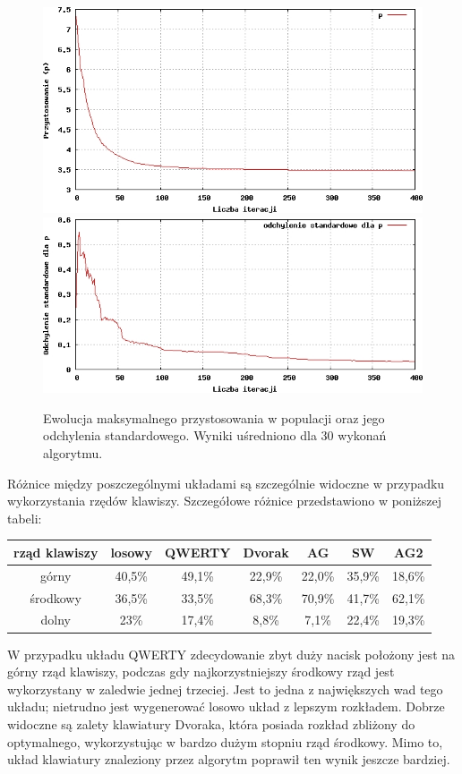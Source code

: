\documentclass{xmgr}
\begin{document}
\begin{figure}[!tbh]
\centering
\includegraphics[width=.8\hsize]{fig/fitness_time_en}
\includegraphics[width=.8\hsize]{fig/std_dev_time_en}
\caption{Ewolucja maksymalnego przystosowania w populacji oraz jego odchylenia standardowego. Wyniki uśredniono dla 30 wykonań algorytmu.}
\end{figure}

Różnice między poszczególnymi układami są szczególnie widoczne w przypadku wykorzystania rzędów klawiszy. Szczegółowe różnice przedstawiono w poniższej tabeli:\newline\newline
\begin{tabular}{ c | c | c | c | c | c | c }
  rząd klawiszy   & losowy & QWERTY & Dvorak & AG &     SW   & AG2 \\
  \hline
  górny           & 40,5\% & 49,1\% & 22,9\% & 22,0\% & 35,9\% & 18,6\% \\
  środkowy        & 36,5\% & 33,5\% & 68,3\% & 70,9\% & 41,7\% & 62,1\% \\
  dolny           &   23\% & 17,4\% &  8,8\% &  7,1\% & 22,4\% & 19,3\% \\
\end{tabular}\newline

W przypadku układu QWERTY zdecydowanie zbyt duży nacisk położony jest na górny rząd klawiszy, podczas gdy najkorzystniejszy środkowy rząd jest wykorzystany w zaledwie jednej trzeciej. Jest to jedna z największych wad tego układu; nietrudno jest wygenerować losowo układ z lepszym rozkładem. Dobrze widoczne są zalety klawiatury Dvoraka, która posiada rozkład zbliżony do optymalnego, wykorzystując w bardzo dużym stopniu rząd środkowy. Mimo to, układ klawiatury znaleziony przez algorytm poprawił ten wynik jeszcze bardziej.
\end{document}
